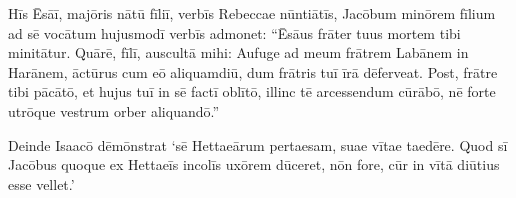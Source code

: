 \Versus Hīs Ēsāī, majōris nātū fīliī, verbīs Rebeccae nūntiātīs, Jacōbum minōrem fīlium ad sē vocātum hujusmodī verbīs admonet: ``Ēsāus frāter tuus mortem tibi minitātur.
\Versus Quārē, fīlī, auscultā mihi: Aufuge ad meum frātrem Labānem in Harānem,
\Versus āctūrus cum eō aliquamdiū, dum frātris tuī īrā dēferveat.
\Versus Post, frātre tibi pācātō, et hujus tuī in sē factī oblītō, illinc tē arcessendum cūrābō, nē forte utrōque vestrum orber aliquandō.''

\Versus Deinde Isaacō dēmōnstrat `sē Hettaeārum pertaesam, suae vītae taedēre. Quod sī Jacōbus quoque ex Hettaeīs incolīs uxōrem dūceret, nōn fore, cūr in vītā diūtius esse vellet.'
